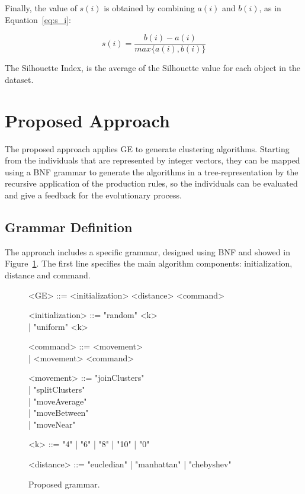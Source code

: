\documentclass[conference]{IEEEtran}
\begin{document}
	
	Finally, the value of $s(i)$ is obtained by combining $a(i)$ and $b(i)$, as in  Equation~\ref{eq:s_i}:
	
	
	\begin{equation} \label{eq:s_i}
	s(i) = \frac{b(i) - a(i)}{max\{a(i), b(i)\}}
	\end{equation}
	
	The Silhouette Index, is the average of the Silhouette value for each object in the dataset.
	
	\section{Proposed Approach} \label{sec:methodology}
	
	
	The proposed approach applies GE to generate clustering algorithms. Starting from the individuals that are represented by integer vectors, they can be mapped using a BNF grammar to generate the algorithms in a tree-representation by the recursive application of the production rules, so the individuals can be evaluated and give a feedback for the evolutionary process.
	
	
	\subsection{Grammar Definition}
	
	The approach includes a specific grammar, designed  using  BNF and showed in Figure~\ref{gr:proposed_grammar}. The first line specifies the main algorithm components: initialization, distance and command. 
	
	
	\begin{figure}[!htb]
		\begin{center}
			\begin{grammar}
				<GE> ::= <initialization> <distance> <command>
				
				<initialization> ::= "random" <k> \\| "uniform" <k>
				
				<command> ::= <movement> \\| <movement> <command>
				
				<movement> ::= "joinClusters" \\| "splitClusters" \\| "moveAverage" \\| "moveBetween" \\| "moveNear"
				
				<k> ::= "4" | "6" | "8" | "10" | "0"
				
				<distance> ::= "eucledian" | "manhattan" | "chebyshev"
			\end{grammar}
		\end{center}
		\caption{Proposed grammar.}
		\label{gr:proposed_grammar}
	\end{figure}
	
\end{document}
